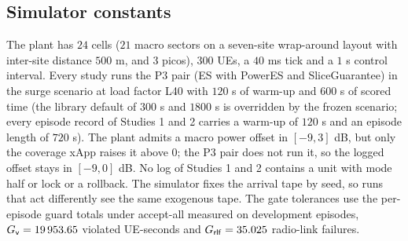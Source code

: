 \subsection{Simulator constants}
\label{spec:sys.sim}

The plant has $24$ cells ($21$ macro sectors on a seven-site wrap-around layout with inter-site distance $500$ m, and $3$ picos), $300$ UEs, a $40$ ms tick and a $1$ s control interval. Every study runs the P3 pair (ES with PowerES and SliceGuarantee) in the surge scenario at load factor L40 with $120$ s of warm-up and $600$ s of scored time (the library default of $300$ s and $1800$ s is overridden by the frozen scenario; every episode record of Studies 1 and 2 carries a warm-up of $120$ s and an episode length of $720$ s). The plant admits a macro power offset in $[-9, 3]$ dB, but only the coverage xApp raises it above $0$; the P3 pair does not run it, so the logged offset stays in $[-9, 0]$ dB. No log of Studies 1 and 2 contains a unit with mode half or lock or a rollback. The simulator fixes the arrival tape by seed, so runs that act differently see the same exogenous tape. The gate tolerances use the per-episode guard totals under accept-all measured on development episodes, $G_{\mathsf{v}} = 19\,953.65$ violated UE-seconds and $G_{\mathsf{rlf}} = 35.025$ radio-link failures.

